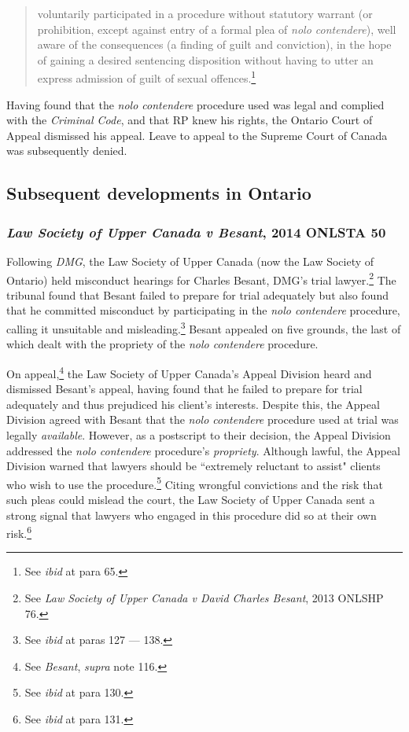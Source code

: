 \begin{quote}
    \singlespacing
    voluntarily participated in a procedure without statutory warrant (or prohibition, except against entry of a formal plea of \textit{nolo contendere}), well aware of the consequences (a finding of guilt and conviction), in the hope of gaining a desired sentencing disposition without having to utter an express admission of guilt of sexual offences.\footnote{See \textit{ibid} at para 65.}
\end{quote} Having found that the \textit{nolo contendere} procedure used was legal and complied with the \textit{Criminal Code}, and that RP knew his rights, the Ontario Court of Appeal dismissed his appeal. Leave to appeal to the Supreme Court of Canada was subsequently denied.

\subsection{Subsequent developments in Ontario}

\subsubsection{\textit{Law Society of Upper Canada v Besant}, 2014 ONLSTA 50}

Following \textit{DMG}, the Law Society of Upper Canada (now the Law Society of Ontario) held misconduct hearings for Charles Besant, DMG's trial lawyer.\footnote{See \textit{Law Society of Upper Canada v David Charles Besant}, 2013 ONLSHP 76.} The tribunal found that Besant failed to prepare for trial adequately but also found that he committed misconduct by participating in the \textit{nolo contendere} procedure, calling it unsuitable and misleading.\footnote{See \textit{ibid} at paras 127 — 138.} Besant appealed on five grounds, the last of which dealt with the propriety of the \textit{nolo contendere} procedure.

On appeal,\footnote{See \textit{Besant}, \textit{supra} note 116.} the Law Society of Upper Canada's Appeal Division heard and dismissed Besant's appeal, having found that he failed to prepare for trial adequately and thus prejudiced his client's interests. Despite this, the Appeal Division agreed with Besant that the \textit{nolo contendere} procedure used at trial was legally \textit{available}. However, as a postscript to their decision, the Appeal Division addressed the \textit{nolo contendere} procedure's \textit{propriety}. Although lawful, the Appeal Division warned that lawyers should be ``extremely reluctant to assist" clients who wish to use the procedure.\footnote{See \textit{ibid} at para 130.} Citing wrongful convictions and the risk that such pleas could mislead the court, the Law Society of Upper Canada sent a strong signal that lawyers who engaged in this procedure did so at their own risk.\footnote{See \textit{ibid} at para 131.} 

